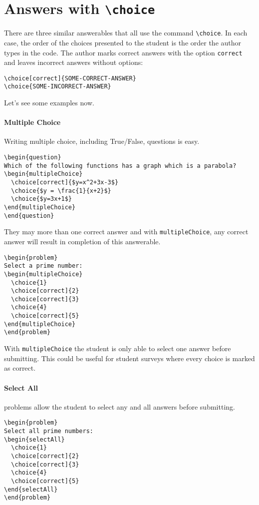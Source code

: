 \documentclass{ximera}
\begin{document}
\section{Answers with \texttt{\textbackslash choice}}

There are three similar answerables that all use the command \verb!\choice!. In
each case, the order of the choices presented to the student is the order the
author types in the code. The author marks correct answers with the option
\verb!correct! and leaves incorrect answers without options:
\begin{verbatim}
\choice[correct]{SOME-CORRECT-ANSWER}
\choice{SOME-INCORRECT-ANSWER}
\end{verbatim}
Let's see some examples now.
\paragraph{Multiple Choice}
Writing multiple choice, including True/False, questions is easy.
\begin{verbatim}
\begin{question}
Which of the following functions has a graph which is a parabola?
\begin{multipleChoice}
  \choice[correct]{$y=x^2+3x-3$}
  \choice{$y = \frac{1}{x+2}$}
  \choice{$y=3x+1$}
\end{multipleChoice}
\end{question}
\end{verbatim}
They may more than one correct answer and with \verb!multipleChoice!, any
correct answer will result in completion of this answerable.
\begin{verbatim}
\begin{problem}
Select a prime number:
\begin{multipleChoice}
  \choice{1}
  \choice[correct]{2}
  \choice[correct]{3}
  \choice{4}
  \choice[correct]{5}
\end{multipleChoice}
\end{problem}
\end{verbatim}
With \verb!multipleChoice! the student is only able to select one answer before
submitting. This could be useful for student surveys where every choice is
marked as correct.

\paragraph{Select All} problems allow the student to select any and all answers
before
submitting.
\begin{verbatim}
\begin{problem}
Select all prime numbers:
\begin{selectAll}
  \choice{1}
  \choice[correct]{2}
  \choice[correct]{3}
  \choice{4}
  \choice[correct]{5}
\end{selectAll}
\end{problem}
\end{verbatim}
\end{document}
